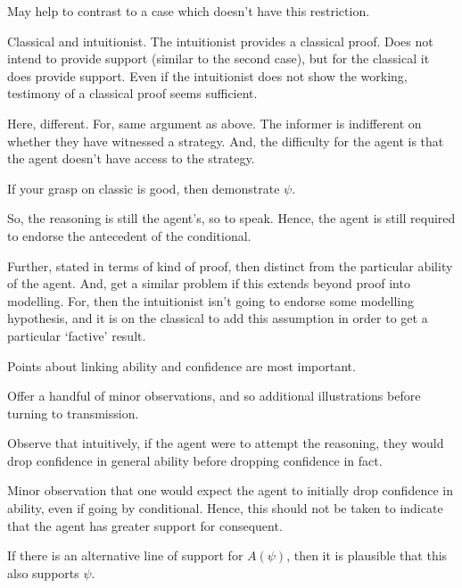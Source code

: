 \documentclass[10pt]{article}
\begin{document}
\begin{note}
  May help to contrast to a case which doesn't have this restriction.

  Classical and intuitionist.
  The intuitionist provides a classical proof.
  Does not intend to provide support (similar to the second case), but for the classical it does provide support.
  Even if the intuitionist does not show the working, testimony of a classical proof seems sufficient.

  Here, different.
  For, same argument as above.
  The informer is indifferent on whether they have witnessed a strategy.
  And, the difficulty for the agent is that the agent doesn't have access to the strategy.

  If your grasp on classic is good, then demonstrate \(\psi\).

  So, the reasoning is still the agent's, so to speak.
  Hence, the agent is still required to endorse the antecedent of the conditional.

  Further, stated in terms of kind of proof, then distinct from the particular ability of the agent.
  And, get a similar problem if this extends beyond proof into modelling.
  For, then the intuitionist isn't going to endorse some modelling hypothesis, and it is on the classical to add this assumption in order to get a particular `factive' result.
\end{note}

\begin{note}
  Points about linking ability and confidence are most important.

  Offer a handful of minor observations, and so additional illustrations before turning to transmission.
\end{note}

\begin{note}
  Observe that intuitively, if the agent were to attempt the reasoning, they would drop confidence in general ability before dropping confidence in fact.

  Minor observation that one would expect the agent to initially drop confidence in ability, even if going by conditional.
  Hence, this should not be taken to indicate that the agent has greater support for consequent.
\end{note}

\begin{note}
  If there is an alternative line of support for \(A(\psi)\), then it is plausible that this also supports \(\psi\).
\end{note}
\end{document}
